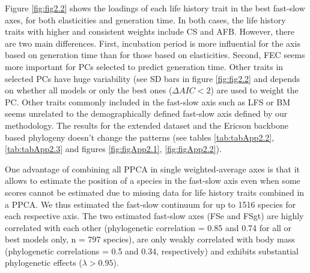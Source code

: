 Figure \ref{fig:fig2.2} shows the loadings of each life history trait in the 
best fast-slow axes, for both elasticities and generation time. In both
cases, the life history traits with higher and consistent weights include CS and
AFB.
However, there are two main differences. First, incubation period is more 
influential for the axis based on generation time than for those based on 
elasticities. Second, FEC seems more important for PCs selected to 
predict generation time. Other traits in selected PCs have huge variability 
(see SD bars in figure \ref{fig:fig2.2} and depends on whether all models or 
only the best ones ($\Delta AIC < 2$) are used to weight the PC. Other traits 
commonly included in the fast-slow axis such as LFS or BM seems unrelated to 
the demographically defined fast-slow axis defined by our methodology. The
results for the extended dataset and the Ericson backbone based phylogeny
doesn't change the patterns (see tables \ref{tab:tabApp2.2},
\ref{tab:tabApp2.3} and figures \ref{fig:figApp2.1}, \ref{fig:figApp2.2}).

One advantage of combining all PPCA in single weighted-average axes is that it 
allows to estimate the position of a species in the fast-slow axis even when
some scores cannot be estimated due to missing data for life history traits
combined in a PPCA. We thus estimated the fast-slow continuum for up to 1516
species for each respective axis.
The two estimated fast-slow axes (FSe and FSgt) are highly correlated with each
other (phylogenetic correlation =  0.85 and 0.74 for all or best models
only, n = 797 species), are only weakly correlated with body mass (phylogenetic
correlations = 0.5 and 0.34, respectively) and exhibits substantial phylogenetic
effects ($\lambda > 0.95$).

